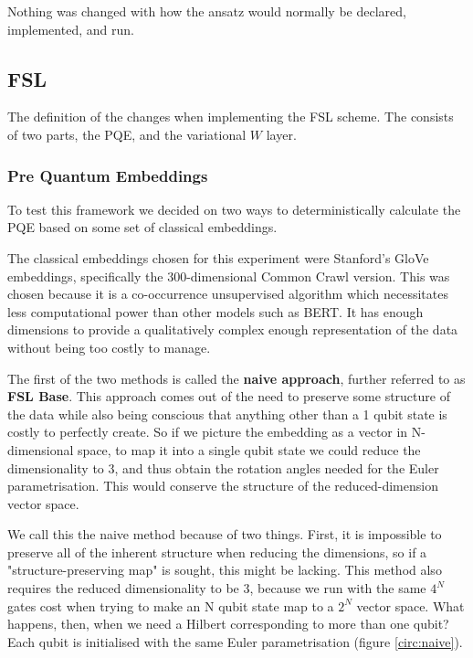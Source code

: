 Nothing was changed with how the ansatz would normally be declared, implemented, and run.



\subsection{FSL \mya}
The definition of the \mya changes when implementing the FSL scheme. The \mya consists of two parts, the PQE, and the variational $W$ layer.
\subsubsection{Pre Quantum Embeddings}
To test this framework we decided on two ways to deterministically calculate the PQE based on some set of classical embeddings. 

The classical embeddings chosen for this experiment were Stanford's GloVe embeddings, specifically the 300-dimensional Common Crawl version. This was chosen because it is a co-occurrence unsupervised algorithm which necessitates less computational power than other models such as BERT. It has enough dimensions to provide a qualitatively complex enough representation of the data without being too costly to manage.

The first of the two methods is called the \textbf{naive approach}, further referred to as \textbf{FSL Base}. This approach comes out of the need to preserve some structure of the data while also being conscious that anything other than a 1 qubit state is costly to perfectly create. So if we picture the embedding as a vector in N-dimensional space, to map it into a single qubit state we could reduce the dimensionality to 3, and thus obtain the rotation angles needed for the Euler parametrisation. This would conserve the structure of the reduced-dimension vector space.

We call this the naive method because of two things. First, it is impossible to preserve all of the inherent structure when reducing the dimensions, so if a "structure-preserving map" is sought, this might be lacking. This method also requires the reduced dimensionality to be 3, because we run with the same $4^N$ gates cost when trying to make an N qubit state map to a $2^N$ vector space. What happens, then, when we need a Hilbert corresponding to more than one qubit? Each qubit is initialised with the same Euler parametrisation (figure \ref{circ:naive}).



